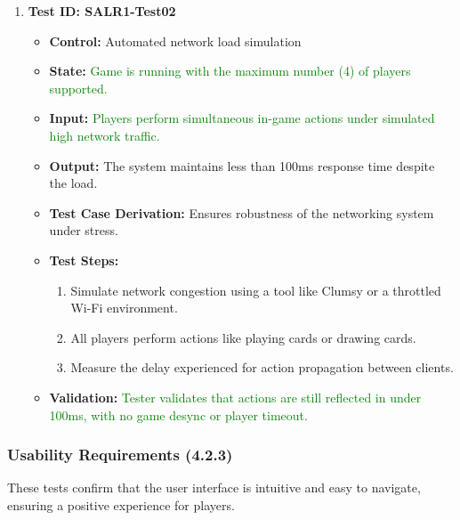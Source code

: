 \documentclass[12pt]{article}
\newcommand{\added}[1]{\textcolor{green}{#1}}
\begin{document}
\begin{enumerate}
    \item \textbf{Test ID: SALR1-Test02}
    \begin{itemize}
        \item \textbf{Control:} Automated network load simulation
        \item \textbf{State:} \added{ Game is running with the maximum number (4) of players supported.}
        \item \textbf{Input:} \added{Players perform simultaneous in-game actions under simulated high network traffic.}
        \item \textbf{Output:} The system maintains less than 100ms response time despite the load.
        \item \textbf{Test Case Derivation:} Ensures robustness of the networking system under stress.
        \item \textbf{Test Steps:}
        \begin{enumerate}
            \item Simulate network congestion using a tool like Clumsy or a throttled Wi-Fi environment.
            \item All players perform actions like playing cards or drawing cards.
            \item Measure the delay experienced for action propagation between clients.
        \end{enumerate}
        \item \textbf{Validation:} \added{Tester validates that actions are still reflected in under 100ms, with no game desync or player timeout.}
    \end{itemize}
\end{enumerate}

\subsubsection{Usability Requirements (4.2.3)}

These tests confirm that the user interface is intuitive and easy to navigate, ensuring a positive experience for players.
\end{document}
